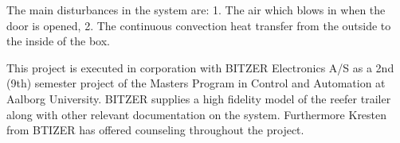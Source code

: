 The main disturbances in the system are: 1. The air which blows in when the door is opened, 2. The continuous convection heat transfer from the outside to the inside of the box.

This project is executed in corporation with BITZER Electronics A/S as a 2nd (9th) semester project of the Masters Program in Control and Automation at Aalborg University. BITZER supplies a high fidelity model of the reefer trailer along with other relevant documentation on the system. Furthermore Kresten from BTIZER has offered counseling throughout the project.

